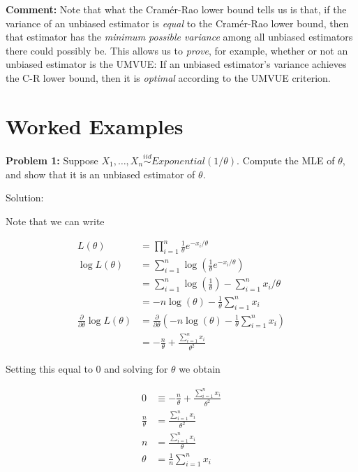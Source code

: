 \documentclass[
  letterpaper,
  DIV=11,
  numbers=noendperiod]{scrreprt}
\begin{document}
\textbf{Comment:} Note that what the Cramér-Rao lower bound tells us is
that, if the variance of an unbiased estimator is \emph{equal} to the
Cramér-Rao lower bound, then that estimator has the \emph{minimum
possible variance} among all unbiased estimators there could possibly
be. This allows us to \emph{prove}, for example, whether or not an
unbiased estimator is the UMVUE: If an unbiased estimator's variance
achieves the C-R lower bound, then it is \emph{optimal} according to the
UMVUE criterion.

\section{Worked Examples}\label{worked-examples-3}

\textbf{Problem 1:} Suppose
\(X_1, \dots, X_n \overset{iid}{\sim} Exponential(1/\theta)\). Compute
the MLE of \(\theta\), and show that it is an unbiased estimator of
\(\theta\).

Solution:

Note that we can write

\begin{align*}
    L(\theta) & = \prod_{i = 1}^n \frac{1}{\theta} e^{-x_i / \theta} \\
    \log L(\theta) & = \sum_{i = 1}^n \log(\frac{1}{\theta} e^{-x_i / \theta}) \\
    & = \sum_{i = 1}^n  \log(\frac{1}{\theta}) - \sum_{i = 1}^n x_i / \theta \\
    & = -n \log(\theta) - \frac{1}{\theta} \sum_{i = 1}^n x_i \\
    \frac{\partial}{\partial \theta} \log L(\theta) & = \frac{\partial}{\partial \theta}  \left( -n \log(\theta) - \frac{1}{\theta} \sum_{i = 1}^n x_i \right) \\
    & = -\frac{n}{\theta} + \frac{\sum_{i = 1}^n x_i }{\theta^2} 
\end{align*}

Setting this equal to \(0\) and solving for \(\theta\) we obtain

\begin{align*}
    0 & \equiv -\frac{n}{\theta} + \frac{\sum_{i = 1}^n x_i }{\theta^2}  \\
    \frac{n}{\theta} & = \frac{\sum_{i = 1}^n x_i }{\theta^2} \\
    n & = \frac{\sum_{i = 1}^n x_i }{\theta} \\
    \theta & = \frac{1}{n} \sum_{i = 1}^n x_i
\end{align*}
\end{document}
